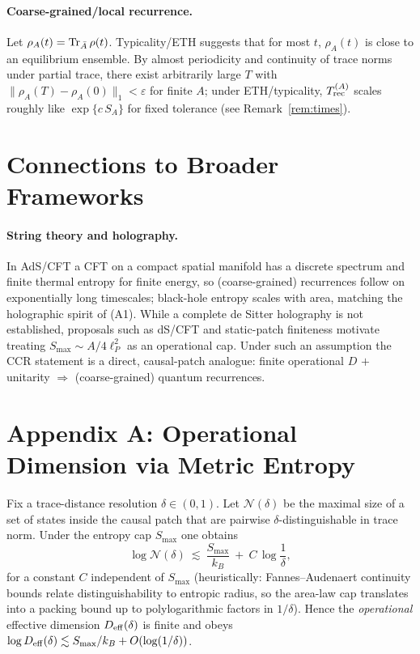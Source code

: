 \documentclass[12pt]{article}
\newcommand{\Smax}{S_{\max}}
\theoremstyle{remark}
\begin{document}
\paragraph{Coarse-grained/local recurrence.} Let $\rho_A(t)=\Tr_{\bar A}\rho(t)$. Typicality/ETH suggests that for most $t$, $\rho_A(t)$ is close to an equilibrium ensemble. By almost periodicity and continuity of trace norms under partial trace, there exist arbitrarily large $T$ with $\|\rho_A(T)-\rho_A(0)\|_1<\varepsilon$ for finite $A$; under ETH/typicality, $T^{(A)}_{\rm rec}$ scales roughly like $\exp\{c\,S_A\}$ for fixed tolerance (see Remark~\ref{rem:times}).

\section{Connections to Broader Frameworks}

\paragraph{String theory and holography.}
In AdS/CFT a CFT on a compact spatial manifold has a discrete spectrum and finite thermal entropy for finite energy, so (coarse-grained) recurrences follow on exponentially long timescales; black-hole entropy scales with area, matching the holographic spirit of (A1). While a complete de Sitter holography is not established, proposals such as dS/CFT and static-patch finiteness motivate treating $\Smax\!\sim\! A/4\ell_P^2$ as an operational cap. Under such an assumption the CCR statement is a direct, causal-patch analogue: finite operational $D$ $+$ unitarity $\Rightarrow$ (coarse-grained) quantum recurrences.

\appendix
\section*{Appendix A: Operational Dimension via Metric Entropy}
Fix a trace-distance resolution $\delta\in(0,1)$. Let $\mathcal{N}(\delta)$ be the maximal size of a set of states inside the causal patch that are pairwise $\delta$-distinguishable in trace norm. Under the entropy cap $\Smax$ one obtains
\[
\log \mathcal{N}(\delta)\ \lesssim\ \frac{\Smax}{k_B}\ +\ C\,\log\!\frac{1}{\delta},
\]
for a constant $C$ independent of $\Smax$ (heuristically: Fannes--Audenaert continuity bounds relate distinguishability to entropic radius, so the area-law cap translates into a packing bound up to polylogarithmic factors in $1/\delta$). Hence the \emph{operational} effective dimension $D_{\rm eff}(\delta)$ is finite and obeys $\log D_{\rm eff}(\delta)\lesssim \Smax/k_B+O(\log(1/\delta))$.
\end{document}
